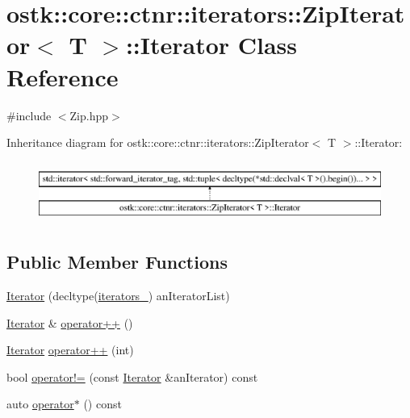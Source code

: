 \hypertarget{classostk_1_1core_1_1ctnr_1_1iterators_1_1_zip_iterator_1_1_iterator}{}\section{ostk\+:\+:core\+:\+:ctnr\+:\+:iterators\+:\+:Zip\+Iterator$<$ T $>$\+:\+:Iterator Class Reference}
\label{classostk_1_1core_1_1ctnr_1_1iterators_1_1_zip_iterator_1_1_iterator}


{\ttfamily \#include $<$Zip.\+hpp$>$}

Inheritance diagram for ostk\+:\+:core\+:\+:ctnr\+:\+:iterators\+:\+:Zip\+Iterator$<$ T $>$\+:\+:Iterator\+:\begin{figure}[H]
\begin{center}
\leavevmode
\includegraphics[height=2.000000cm]{classostk_1_1core_1_1ctnr_1_1iterators_1_1_zip_iterator_1_1_iterator}
\end{center}
\end{figure}
\subsection*{Public Member Functions}
\begin{DoxyCompactItemize}
\item 
\hyperlink{classostk_1_1core_1_1ctnr_1_1iterators_1_1_zip_iterator_1_1_iterator_acedc2e5184ab630d05c1b787c9052d50}{Iterator} (decltype(\hyperlink{classostk_1_1core_1_1ctnr_1_1iterators_1_1_zip_iterator_1_1_iterator_a37f6521fb9d0c8ec3ab94c56c06dd475}{iterators\+\_\+}) an\+Iterator\+List)
\item 
\hyperlink{classostk_1_1core_1_1ctnr_1_1iterators_1_1_zip_iterator_1_1_iterator}{Iterator} \& \hyperlink{classostk_1_1core_1_1ctnr_1_1iterators_1_1_zip_iterator_1_1_iterator_af6f0d0354e4f1a5e48b3d1e6671ed40d}{operator++} ()
\item 
\hyperlink{classostk_1_1core_1_1ctnr_1_1iterators_1_1_zip_iterator_1_1_iterator}{Iterator} \hyperlink{classostk_1_1core_1_1ctnr_1_1iterators_1_1_zip_iterator_1_1_iterator_adfe6573d7cb46ee10ee933521777719d}{operator++} (int)
\item 
bool \hyperlink{classostk_1_1core_1_1ctnr_1_1iterators_1_1_zip_iterator_1_1_iterator_abebad80eb725d8770ca4fd907aeaff25}{operator!=} (const \hyperlink{classostk_1_1core_1_1ctnr_1_1iterators_1_1_zip_iterator_1_1_iterator}{Iterator} \&an\+Iterator) const
\item 
auto \hyperlink{classostk_1_1core_1_1ctnr_1_1iterators_1_1_zip_iterator_1_1_iterator_a3a1cfa88cd06763edeaeffadea4740c5}{operator$\ast$} () const
\end{DoxyCompactItemize}
